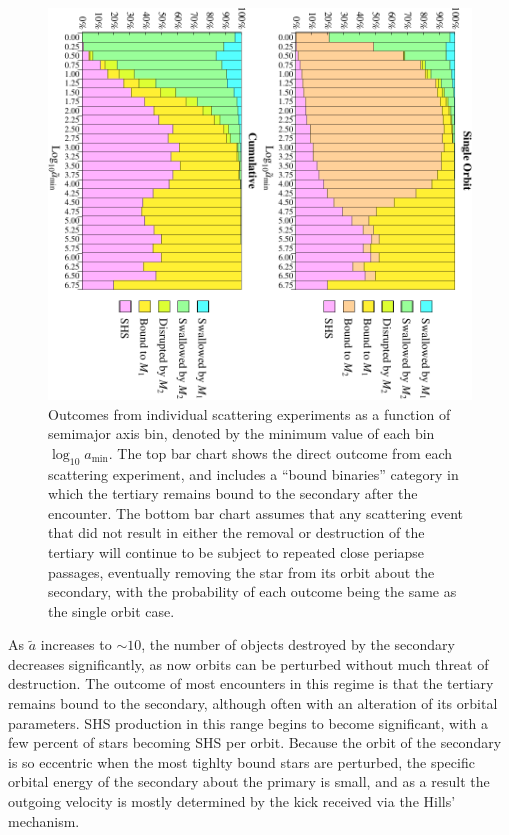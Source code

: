 \documentclass[a4paper,twocolumn]{emulateapj}
\begin{document}
{\begin{figure}
\centering\includegraphics[width=\linewidth,clip=true,angle=90]{fate}
\caption{Outcomes from individual scattering experiments as a function of semimajor axis bin, denoted by the minimum value of each bin $\log_{10} a_{\min}$. The top bar chart shows the direct outcome from each scattering experiment, and includes a ``bound binaries'' category in which the tertiary remains bound to the secondary after the encounter. The bottom bar chart assumes that any scattering event that did not result in either the removal or destruction of the tertiary will continue to be subject to repeated close periapse passages, eventually removing the star from its orbit about the secondary, with the probability of each outcome being the same as the single orbit case.}
\label{fig:fate}
\end{figure}

As $\tilde{a}$ increases to $\sim 10$, the number of objects destroyed by the secondary decreases significantly, as now orbits can be perturbed without much threat of destruction. The outcome of most encounters in this regime is that the tertiary remains bound to the secondary, although often with an alteration of its orbital parameters. SHS production in this range begins to become significant, with a few percent of stars becoming SHS per orbit. Because the orbit of the secondary is so eccentric when the most tighlty bound stars are perturbed, the specific orbital energy of the secondary about the primary is small, and as a result the outgoing velocity is mostly determined by the kick received via the Hills' mechanism.

}
\end{document}
